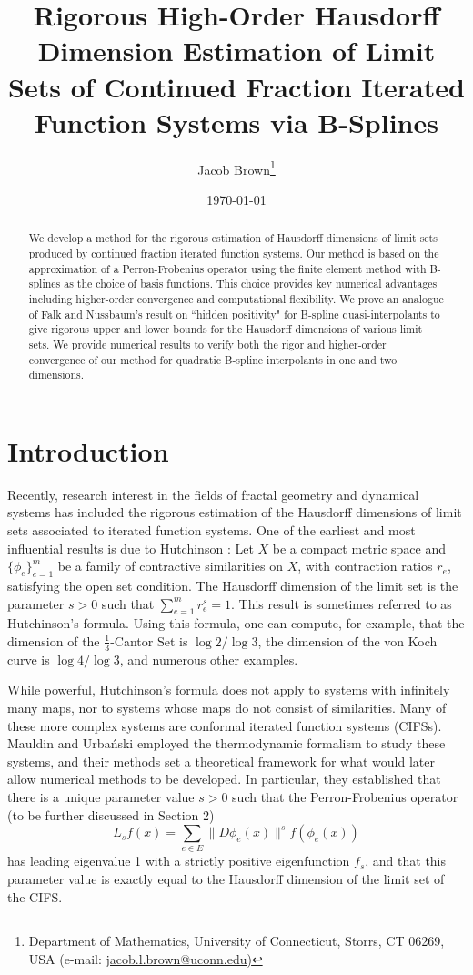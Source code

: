 \documentclass[10pt]{article}
\title{Rigorous High-Order Hausdorff Dimension Estimation of Limit Sets of Continued Fraction Iterated Function Systems via B-Splines}
\author{Jacob Brown\footnote{Department of Mathematics, University of Connecticut, Storrs, CT 06269, USA (e-mail: \href{mailto:jacob.l.brown@uconn.edu}{jacob.l.brown@uconn.edu)}}}
\date{\today}
\theoremstyle{definition}
\numberwithin{equation}{section}
\numberwithin{figure}{section}
\numberwithin{table}{section}
\begin{document}
\maketitle

\begin{abstract}
We develop a method for the rigorous estimation of Hausdorff dimensions of limit sets produced by continued fraction iterated function systems. Our method is based on the approximation of a Perron-Frobenius operator using the finite element method with B-splines as the choice of basis functions. This choice provides key numerical advantages including higher-order convergence and computational flexibility. We prove an analogue of Falk and Nussbaum's result on ``hidden positivity" for B-spline quasi-interpolants to give rigorous upper and lower bounds for the Hausdorff dimensions of various limit sets. We provide numerical results to verify both the rigor and higher-order convergence of our method for quadratic B-spline interpolants in one and two dimensions.
\end{abstract}

\section{Introduction}

Recently, research interest in the fields of fractal geometry and dynamical systems has included the rigorous estimation of the Hausdorff dimensions of limit sets associated to iterated function systems. One of the earliest and most influential results is due to Hutchinson \cite{hutchinson1981fractals}: Let $X$ be a compact metric space and $\{\phi_e\}_{e=1}^m$ be a family of contractive similarities on $X$, with contraction ratios $r_e$, satisfying the open set condition. The Hausdorff dimension of the limit set is the parameter $s>0$ such that $\sum_{e=1}^mr_e^s=1$. This result is sometimes referred to as Hutchinson's formula. Using this formula, one can compute, for example, that the dimension of the $\frac{1}{3}$-Cantor Set is $\log2/\log3$, the dimension of the von Koch curve is $\log4/\log3$, and numerous other examples.

While powerful, Hutchinson's formula does not apply to systems with infinitely many maps, nor to systems whose maps do not consist of similarities. Many of these more complex systems are conformal iterated function systems (CIFSs). Mauldin and Urba\'{n}ski \cite{mauldin1996dimensions} employed the thermodynamic formalism to study these systems, and their methods set a theoretical framework for what would later allow numerical methods to be developed. In particular, they established that there is a unique parameter value $s>0$ such that the Perron-Frobenius operator (to be further discussed in Section 2)
$$L_sf(x)=\sum_{e\in E}\|D\phi_e(x)\|^sf(\phi_e(x))$$
has leading eigenvalue 1 with a strictly positive eigenfunction $f_s$, and that this parameter value is exactly equal to the Hausdorff dimension of the limit set of the CIFS. 
\end{document}
